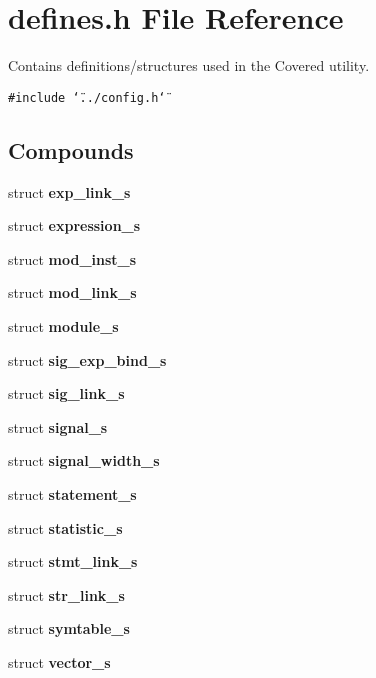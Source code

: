 \section{defines.h File Reference}
\label{defines_8h}
Contains definitions/structures used in the Covered utility. 


{\tt \#include \char`\"{}../config.h\char`\"{}}\par
\subsection*{Compounds}
\begin{CompactItemize}
\item 
struct {\bf exp\_\-link\_\-s}
\item 
struct {\bf expression\_\-s}
\item 
struct {\bf mod\_\-inst\_\-s}
\item 
struct {\bf mod\_\-link\_\-s}
\item 
struct {\bf module\_\-s}
\item 
struct {\bf sig\_\-exp\_\-bind\_\-s}
\item 
struct {\bf sig\_\-link\_\-s}
\item 
struct {\bf signal\_\-s}
\item 
struct {\bf signal\_\-width\_\-s}
\item 
struct {\bf statement\_\-s}
\item 
struct {\bf statistic\_\-s}
\item 
struct {\bf stmt\_\-link\_\-s}
\item 
struct {\bf str\_\-link\_\-s}
\item 
struct {\bf symtable\_\-s}
\item 
struct {\bf vector\_\-s}
\end{CompactItemize}
